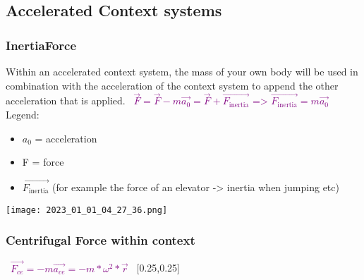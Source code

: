 \documentclass[main.tex,fontsize=8pt,paper=a4,paper=portrait,DIV=calc,]{scrartcl}
\begin{document}
\begin{multicols*}{2}
\subsection{Accelerated Context systems}
\subsubsection{InertiaForce}
Within an accelerated context system, the mass of your own body will be used in combination with the acceleration of the context system to append the other acceleration that is applied.
\, \newline
\large \textcolor{purple}{\( \vec{F} = \vec{F} - m\vec{a_0} = \vec{F} + \vec{F_{\text{inertia}}} \text{ => } \vec{F_{\text{inertia}}} = m\vec{a_0} \)}\newline
\, \newline
\normalsize Legend: \newline
\begin{itemize}
\item \(a_0\) = acceleration
\item F = force
\item \(\vec{F_{\text{inertia}}}\) (for example the force of an elevator -> inertia when jumping etc) 
\end{itemize} 
\texttt{[image: 2023\_01\_01\_04\_27\_36.png]}

\subsubsection{Centrifugal Force within context}
\, \newline
\large \textcolor{purple}{\( \vec{F_{ce}} = -m\vec{a_{ce}} = -m * \omega^2 * \vec{r} \)}\newline
\, \newline
\normalsize 
{}[0.25,0.25]


\end{multicols*}
\end{document}
